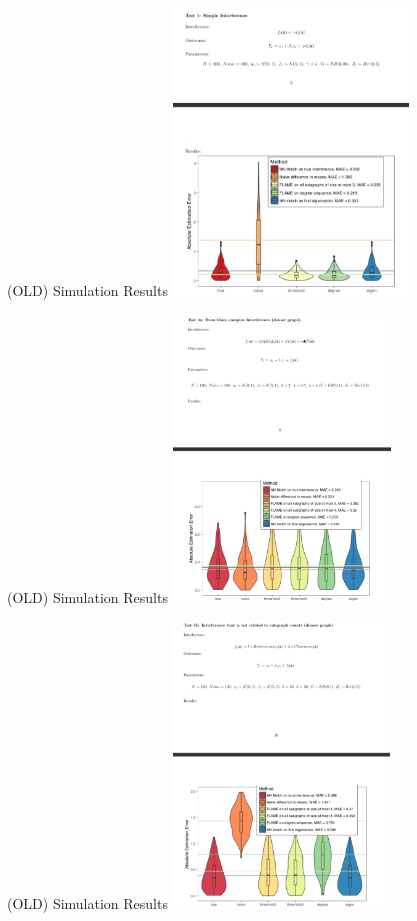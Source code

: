 \documentclass[newPxFont,numfooter,sectionpages]{beamer}
\begin{document}
\begin{frame}{(OLD) Simulation Results}
\centering
\includegraphics[height=3in]{simple.png}
\end{frame}
\begin{frame}{(OLD) Simulation Results}
\centering
\includegraphics[height=3in]{even_more_complex.png}
\end{frame}
\begin{frame}{(OLD) Simulation Results}
\centering
\includegraphics[height=3in]{unrelated_dense.png}
\end{frame}
\end{document}
